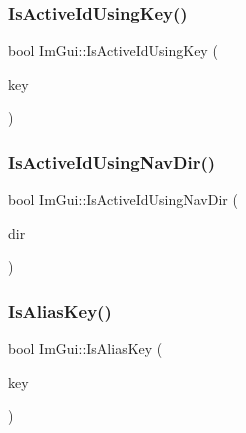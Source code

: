 \subsubsection{\texorpdfstring{Is\+Active\+Id\+Using\+Key()}{IsActiveIdUsingKey()}}
{\footnotesize\ttfamily bool Im\+Gui\+::\+Is\+Active\+Id\+Using\+Key (\begin{DoxyParamCaption}\item[{\hyperlink{imgui_8h_aa22ffe36b188427d712447ec465203d4}{Im\+Gui\+Key}}]{key }\end{DoxyParamCaption})\hspace{0.3cm}{\ttfamily [inline]}}

\mbox{\label{namespaceImGui_a900c43afe3b59d3844ca4c9ff27ef4f6}} 
\subsubsection{\texorpdfstring{Is\+Active\+Id\+Using\+Nav\+Dir()}{IsActiveIdUsingNavDir()}}
{\footnotesize\ttfamily bool Im\+Gui\+::\+Is\+Active\+Id\+Using\+Nav\+Dir (\begin{DoxyParamCaption}\item[{Im\+Gui\+Dir}]{dir }\end{DoxyParamCaption})\hspace{0.3cm}{\ttfamily [inline]}}

\mbox{\label{namespaceImGui_ac8e09701fd3ff94f49df16ecd6526149}} 
\subsubsection{\texorpdfstring{Is\+Alias\+Key()}{IsAliasKey()}}
{\footnotesize\ttfamily bool Im\+Gui\+::\+Is\+Alias\+Key (\begin{DoxyParamCaption}\item[{\hyperlink{imgui_8h_aa22ffe36b188427d712447ec465203d4}{Im\+Gui\+Key}}]{key }\end{DoxyParamCaption})\hspace{0.3cm}{\ttfamily [inline]}}

\mbox{\label{namespaceImGui_acdc18199d50d26919312db5f9707b8dc}} 
